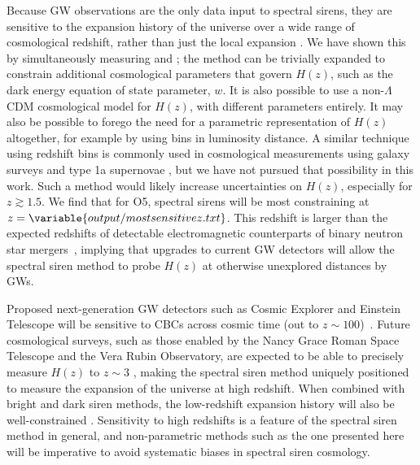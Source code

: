 \documentclass[preprint2,linenumbers]{aastex631}
\begin{document}
Because \ac{GW} observations are the only data input to spectral sirens, they are sensitive to the expansion history of the universe over a wide range of cosmological redshift, rather than just the local expansion \Ho.
We have shown this by simultaneously measuring \Omm{} and \Ho{}; the method can be trivially expanded to constrain additional cosmological parameters that govern $H(z)$, such as the dark energy equation of state parameter, $w$. 
It is also possible to use a non-$\Lambda$CDM cosmological model for $H(z)$, with different parameters entirely.
It may also be possible to forego the need for a parametric representation of $H(z)$ altogether, for example by using bins in luminosity distance.
A similar technique using redshift bins is commonly used in cosmological measurements using galaxy surveys and type 1a supernovae \citep[e.g.][]{perlmutter_measuring_2003,anderson_clustering_2014,aghamousa_desi_2016}, but we have not pursued that possibility in this work.
Such a method would likely increase uncertainties on $H(z)$, especially for $z\gtrsim 1.5$.
We find that for \acl{O5}, spectral sirens will be most constraining at $z=\variable{output/mostsensitivez.txt}$.
This redshift is larger than the expected redshifts of detectable electromagnetic counterparts of binary neutron star mergers~\citep{kiendrebeogo_updated_2023}, implying that upgrades to current \ac{GW} detectors will allow the spectral siren method to probe $H(z)$ at otherwise unexplored distances by \acp{GW}. 

Proposed next-generation \ac{GW} detectors such as Cosmic Explorer and Einstein Telescope will be sensitive to \acp{CBC} across cosmic time (out to $z\sim100$)~\citep{et_steering_committee_einstein_2020, evans_horizon_2021}.
Future cosmological surveys, such as those enabled by the Nancy Grace Roman Space Telescope and the Vera Rubin Observatory, are expected to be able to precisely measure $H(z)$ to $z\sim3$ \citep{spergel_wide-field_2015}, making the spectral siren method uniquely positioned to measure the expansion of the universe at high redshift.
When combined with bright and dark siren methods, the low-redshift expansion history will also be well-constrained \citep{Chen:2024gdn}.
Sensitivity to high redshifts is a feature of the spectral siren method in general, and non-parametric methods such as the one presented here will be imperative to avoid systematic biases in spectral siren cosmology. 
\end{document}
